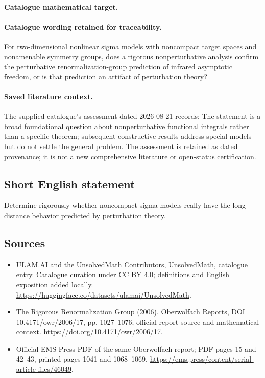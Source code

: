 \documentclass[11pt]{article}
\begin{document}
\paragraph{Catalogue mathematical target.}
\paragraph{Catalogue wording retained for traceability.}
For two-dimensional nonlinear sigma models with noncompact target spaces and nonamenable symmetry groups, does a rigorous nonperturbative analysis confirm the perturbative renormalization-group prediction of infrared asymptotic freedom, or is that prediction an artifact of perturbation theory?

\paragraph{Saved literature context.} The supplied catalogue's assessment dated 2026-08-21 records: The statement is a broad foundational question about nonperturbative functional integrals rather than a specific theorem; subsequent constructive results address special models but do not settle the general problem. The assessment is retained as dated provenance; it is not a new comprehensive literature or open-status certification.
\subsection{Short English statement}
Determine rigorously whether noncompact sigma models really have the long-distance behavior predicted by perturbation theory.
\subsection{Sources}
\begin{itemize}
\item[\hypertarget{source:statement:1}{S1}] ULAM.AI and the UnsolvedMath Contributors, UnsolvedMath, catalogue entry. Catalogue curation under CC BY 4.0; definitions and English exposition added locally.
\url{https://huggingface.co/datasets/ulamai/UnsolvedMath}.
\item[\hypertarget{source:statement:2}{S2}] The Rigorous Renormalization Group (2006), Oberwolfach Reports, DOI 10.4171/owr/2006/17, pp. 1027--1076; official report source and mathematical context.
\url{https://doi.org/10.4171/owr/2006/17}.
\item[\hypertarget{source:statement:3}{S3}] Official EMS Press PDF of the same Oberwolfach report; PDF pages 15 and 42--43, printed pages 1041 and 1068--1069.
\url{https://ems.press/content/serial-article-files/46049}.
\end{itemize}
\label{end:statement}
\end{document}
